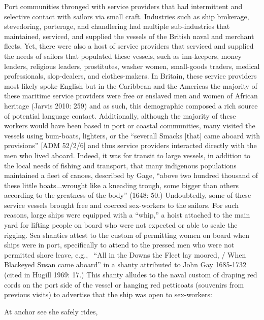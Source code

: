 \begin{styleStandard}
Port communities thronged with service providers that had intermittent and selective contact with sailors via small craft. Industries such as ship brokerage, stevedoring, porterage, and chandlering had multiple sub-industries that maintained, serviced, and supplied the vessels of the British naval and merchant fleets. Yet, there were also a host of service providers that serviced and supplied the needs of sailors that populated these vessels, such as inn-keepers, money lenders, religious leaders, prostitutes, washer women, small-goods traders, medical professionals, slop-dealers, and clothes-makers. In Britain, these service providers most likely spoke English but in the Caribbean and the Americas the majority of these maritime service providers were free or enslaved men and women of African heritage (Jarvis 2010: 259) and as such, this demographic composed a rich source of potential language contact. Additionally, although the majority of these workers would have been based in port or coastal communities, many visited the vessels using bum-boats, lighters, or the “severall Smacks [that] came aboard with provisions” [ADM 52/2/6] and thus service providers interacted directly with the men who lived aboard. Indeed, it was for transit to large vessels, in addition to the local needs of fishing and transport, that many indigenous populations maintained a fleet of canoes, described by Gage, “above two hundred thousand of these little boats...wrought like a kneading trough, some bigger than others according to the greatness of the body” (1648: 50.) Undoubtedly, some of these service vessels brought free and coerced sex-workers to the sailors. For such reasons, large ships were equipped with a “whip,” a hoist attached to the main yard for lifting people on board who were not expected or able to scale the rigging. Sea shanties attest to the custom of permitting women on board when ships were in port, specifically to attend to the pressed men who were not permitted shore leave, e.g., \ “All in the Downs the Fleet lay moored, / When Blackeyed Susan came aboard” in a shanty attributed to John Gay 1685-1732 (cited in Hugill 1969: 17.) This shanty alludes to the naval custom of draping red cords on the port side of the vessel or hanging red petticoats (souvenirs from previous visits) to advertise that the ship was open to sex-workers: 
\end{styleStandard}

\begin{styleStandard}
At anchor see she safely rides, 
\end{styleStandard}

